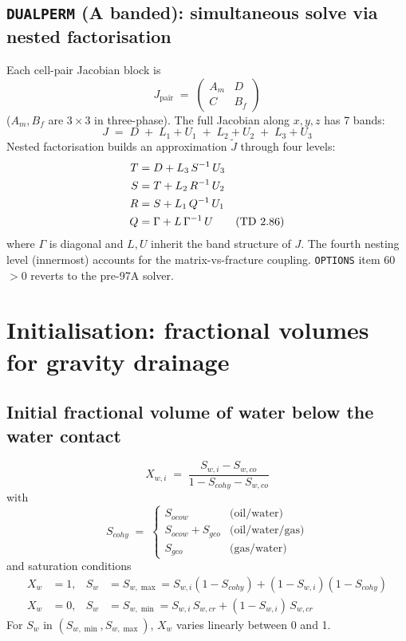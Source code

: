 \documentclass[11pt,a4paper]{article}
\newcommand{\kw}[1]{\texttt{#1}}
\begin{document}
\subsection*{\kw{DUALPERM} (A banded): simultaneous solve via nested factorisation}
Each cell-pair Jacobian block is
\begin{equation}
J_{\text{pair}} \;=\;
\begin{pmatrix} A_m & D \\[1pt] C & B_f \end{pmatrix}
\label{eq:dk-jac}
\tag{TD 2.84}
\end{equation}
($A_m,B_f$ are $3\times3$ in three-phase). The full Jacobian along $x,y,z$ has 7 bands:
\begin{equation}
J \;=\; D \;+\; L_1 + U_1 \;+\; L_2 + U_2 \;+\; L_3 + U_3
\label{eq:dk-bands}
\tag{TD 2.85}
\end{equation}
Nested factorisation builds an approximation $\tilde J$ through four levels:
\begin{align}
T &= D + L_3 \, S^{-1}\, U_3 \notag\\
S &= T + L_2 \, R^{-1}\, U_2 \notag\\
R &= S + L_1 \, Q^{-1}\, U_1 \notag\\
Q &= \Gamma + L\,\Gamma^{-1}\,U
\label{eq:dk-nf}
\tag{TD 2.86}
\end{align}
where $\Gamma$ is diagonal and $L,U$ inherit the band structure of $J$. The fourth nesting level (innermost) accounts for the matrix-vs-fracture coupling. \kw{OPTIONS} item 60 $>0$ reverts to the pre-97A solver.

\section{Initialisation: fractional volumes for gravity drainage}

\subsection*{Initial fractional volume of water below the water contact}
\begin{equation}
X_{w,i} \;=\; \frac{S_{w,i} - S_{w,co}}{1 - S_{coh y} - S_{w,co}}
\label{eq:Xwi}
\tag{TD 2.87}
\end{equation}
with
\[
S_{coh y} \;=\;
\begin{cases}
S_{ocow} & \text{(oil/water)}\\
S_{ocow} + S_{gco} & \text{(oil/water/gas)}\\
S_{gco} & \text{(gas/water)}
\end{cases}
\]
and saturation conditions
\begin{align*}
X_w &= 1, & S_w &= S_{w,\max} = S_{w,i}(1 - S_{coh y}) + (1 - S_{w,i})(1 - S_{coh y}) \\[1pt]
X_w &= 0, & S_w &= S_{w,\min} = S_{w,i}\,S_{w,cr} + (1 - S_{w,i})\,S_{w,cr}
\end{align*}
For $S_w$ in $(S_{w,\min}, S_{w,\max})$, $X_w$ varies linearly between 0 and 1.
\end{document}
